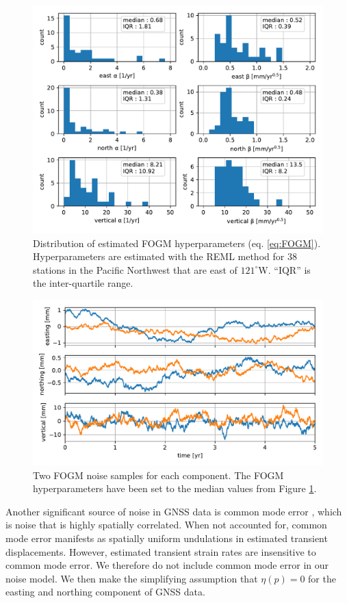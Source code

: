 \documentclass[10pt,letter]{article}
\begin{document}
\begin{figure}
\includegraphics{figures/noise/noise-params.pdf}
\caption{Distribution of estimated FOGM hyperparameters (eq. \ref{eq:FOGM}). Hyperparameters are estimated with the REML method for 38 stations in the Pacific Northwest that are east of $121^\circ$W. ``IQR'' is the inter-quartile range.}   
\label{fig:NoiseParams}
\end{figure}

\begin{figure}
\includegraphics{figures/noise/noise-samples.pdf}
\caption{Two FOGM noise samples for each component. The FOGM hyperparameters have been set to the median values from Figure \ref{fig:NoiseParams}.}   
\label{fig:NoiseSamples}
\end{figure}

Another significant source of noise in GNSS data is common mode error \citep[e.g.,][]{Wdowinski1997,Dong2006}, which is noise that is highly spatially correlated. When not accounted for, common mode error manifests as spatially uniform undulations in estimated transient displacements. However, estimated transient strain rates are insensitive to common mode error. We therefore do not include common mode error in our noise model. We then make the simplifying assumption that $\eta(p) = 0$ for the easting and northing component of GNSS data.  
\end{document}

